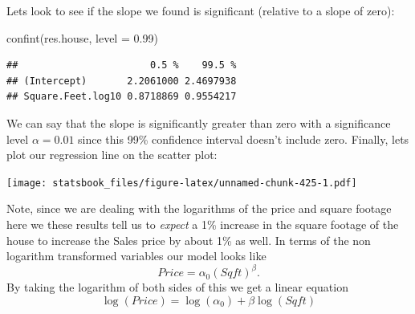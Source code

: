\documentclass[
]{book}
\newenvironment{Shaded}{\begin{snugshade}}{\end{snugshade}}
\newcommand{\AttributeTok}[1]{\textcolor[rgb]{0.77,0.63,0.00}{#1}}
\newcommand{\FloatTok}[1]{\textcolor[rgb]{0.00,0.00,0.81}{#1}}
\newcommand{\FunctionTok}[1]{\textcolor[rgb]{0.00,0.00,0.00}{#1}}
\newcommand{\NormalTok}[1]{#1}
\newcommand{\SpecialCharTok}[1]{\textcolor[rgb]{0.00,0.00,0.00}{#1}}
\newcommand{\StringTok}[1]{\textcolor[rgb]{0.31,0.60,0.02}{#1}}
\theoremstyle{definition}
\theoremstyle{definition}
\theoremstyle{definition}
\theoremstyle{definition}
\theoremstyle{remark}
\begin{document}
Lets look to see if the slope we found is significant (relative to a slope of zero):

\begin{Shaded}
\begin{Highlighting}[]
\FunctionTok{confint}\NormalTok{(res.house, }\AttributeTok{level =} \FloatTok{0.99}\NormalTok{)}
\end{Highlighting}
\end{Shaded}

\begin{verbatim}
##                       0.5 %    99.5 %
## (Intercept)       2.2061000 2.4697938
## Square.Feet.log10 0.8718869 0.9554217
\end{verbatim}

We can say that the slope is significantly greater than zero with a significance level \(\alpha=0.01\) since this 99\% confidence interval doesn't include zero. Finally, lets plot our regression line on the scatter plot:

\begin{Shaded}
\end{Shaded}

\texttt{[image: statsbook\_files/figure-latex/unnamed-chunk-425-1.pdf]}

Note, since we are dealing with the logarithms of the price and square footage here we these results tell us to \emph{expect} a 1\% increase in the square footage of the house to increase the Sales price by about 1\% as well. In terms of the non logarithm transformed variables our model looks like \[Price=\alpha_0(Sqft)^{\beta}.\] By taking the logarithm of both sides of this we get a linear equation \[\log(Price)=\log(\alpha_0)+\beta \log(Sqft)\]
\end{document}
